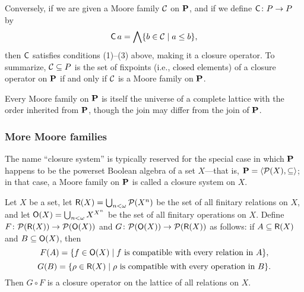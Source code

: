 Conversely, if we are given a Moore family $\mathcal{C}$ on $\mathbf{P}$, and if we define 
$\operatorname{\mathsf{C}} \colon P \to P$ by
\[
\operatorname{\mathsf{C}} a = \bigwedge \{b \in \mathcal{C} \mid a\leq b\},
\]
then $\operatorname{\mathsf{C}}$ satisfies conditions (1)--(3)
above, making it a closure operator.
To summarize, $\mathcal{C} \subseteq P$ is the set of fixpoints (i.e., closed elements)
of a closure operator on
$\mathbf{P}$ if and only if $\mathcal{C}$ is a Moore family on $\mathbf{P}$.

Every Moore family on $\mathbf{P}$ is itself the universe of a complete lattice with the order inherited
from $\mathbf{P}$, though the join may differ from the join of $\mathbf{P}$.

\subsubsection{More Moore families}
The name ``closure system'' is typically reserved for the special case
in which $\mathbf{P}$ happens to be the powerset Boolean
algebra of a set $X$---that is, $\mathbf{P} = \langle\mathcal{P}(X), \subseteq\rangle$; in that case, a Moore family on $\mathbf{P}$ 
is called a closure system on $X$. 

\begin{example}
  Let $X$ be a set,
  let $\mathsf{R}(X) = \bigcup_{n<\omega}\mathcal{P}(X^n)$ be the set of all finitary
  relations on $X$, and let
  $\mathsf{O}(X) = \bigcup_{n< \omega} X^{X^n}$ be the set of all finitary operations on $X$.
  Define $F \colon  \mathcal{P}(\mathsf{R}(X)) \to \mathcal{P}(\mathsf{O}(X))$
  and $G \colon \mathcal{P}(\mathsf{O}(X)) \to \mathcal{P}(\mathsf{R}(X))$ as follows:
  if $A \subseteq\mathsf{R}(X)$ and $B \subseteq \mathsf{O}(X)$, then
  \[
  F(A) = \{f \in \mathsf{O}(X) \mid f \text{ is compatible with every relation in $A$}\},
  \]
  \[
  G(B) = \{\rho \in \mathsf{R}(X) \mid \rho \text{ is compatible with every operation in $B$}\}.
  \]
  Then $G \circ F$ is a closure operator on the lattice %
  of all relations on $X$.
\end{example}

